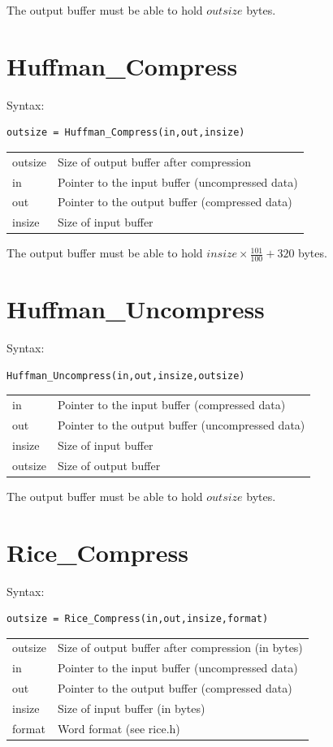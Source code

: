 \documentclass[a4paper,11pt,oneside]{report}
\begin{document}
The output buffer must be able to hold $outsize$ bytes.


\section{Huffman\_Compress}
Syntax:
\begin{lstlisting}
outsize = Huffman_Compress(in,out,insize)
\end{lstlisting}

\begin{tabular}{ll}
outsize & Size of output buffer after compression\\
in      & Pointer to the input buffer (uncompressed data)\\
out     & Pointer to the output buffer (compressed data)\\
insize  & Size of input buffer
\end{tabular}

The output buffer must be able to hold $insize\times\frac{101}{100}+320$ bytes.


\section{Huffman\_Uncompress}
Syntax:
\begin{lstlisting}
Huffman_Uncompress(in,out,insize,outsize)
\end{lstlisting}

\begin{tabular}{ll}
in      & Pointer to the input buffer (compressed data)\\
out     & Pointer to the output buffer (uncompressed data)\\
insize  & Size of input buffer\\
outsize & Size of output buffer
\end{tabular}

The output buffer must be able to hold $outsize$ bytes.


\section{Rice\_Compress}
Syntax:
\begin{lstlisting}
outsize = Rice_Compress(in,out,insize,format)
\end{lstlisting}

\begin{tabular}{ll}
outsize & Size of output buffer after compression (in bytes)\\
in      & Pointer to the input buffer (uncompressed data)\\
out     & Pointer to the output buffer (compressed data)\\
insize  & Size of input buffer (in bytes)\\
format  & Word format (see rice.h)
\end{tabular}
\end{document}
